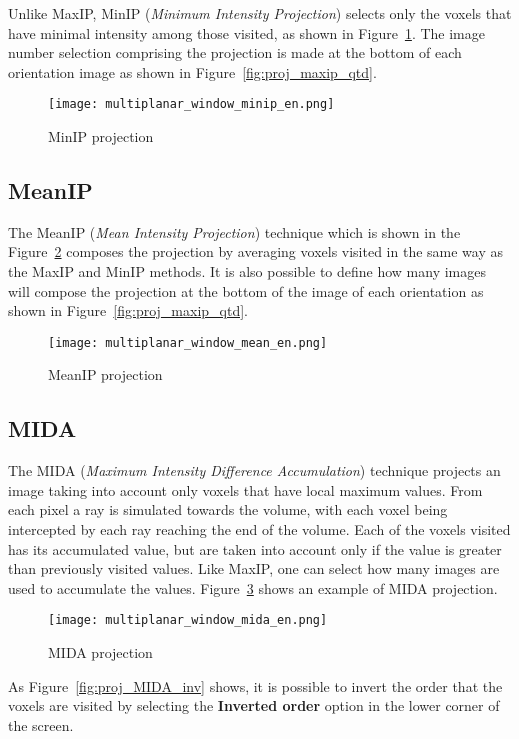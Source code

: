 Unlike MaxIP, MinIP (\textit{Minimum Intensity Projection}) selects only the voxels that have minimal intensity among those visited, as shown in Figure~\ref{fig:proj_minIP}. The image number selection comprising the projection is made at the bottom of each orientation image as shown in Figure~\ref{fig:proj_maxip_qtd}.

\begin{figure}[!h]
\centering
\texttt{[image: multiplanar\_window\_minip\_en.png]}
\caption{MinIP projection}
\label{fig:proj_minIP}
\end{figure}

\subsection{MeanIP}
The MeanIP (\textit{Mean Intensity Projection}) technique which is shown in the Figure~\ref{fig:proj_meanIP} composes the projection by averaging voxels visited in the same way as the MaxIP and MinIP methods. It is also possible to define how many images will compose the projection at the bottom of the image of each orientation as shown in Figure~\ref{fig:proj_maxip_qtd}.

\begin{figure}[!h]
\centering
\texttt{[image: multiplanar\_window\_mean\_en.png]}
\caption{MeanIP projection}
\label{fig:proj_meanIP}
\end{figure}

\subsection{MIDA}
\label{sub:mida}
The MIDA (\textit{Maximum Intensity Difference Accumulation}) technique projects an image taking into account only voxels that have local maximum values. From each pixel a ray is simulated towards the volume, with each voxel being intercepted by each ray reaching the end of the volume. Each of the voxels visited has its accumulated value, but are taken into account only if the value is greater than previously visited values. Like MaxIP, one can select how many images are used to accumulate the values. Figure~\ref{fig:proj_MIDA} shows an example of MIDA projection.

\begin{figure}[!h]
\centering
\texttt{[image: multiplanar\_window\_mida\_en.png]}
\caption{MIDA projection}
\label{fig:proj_MIDA}
\end{figure}

As Figure~\ref{fig:proj_MIDA_inv} shows, it is possible to invert the order that the voxels are visited by selecting the \textbf{Inverted order} option in the lower corner of the screen.

